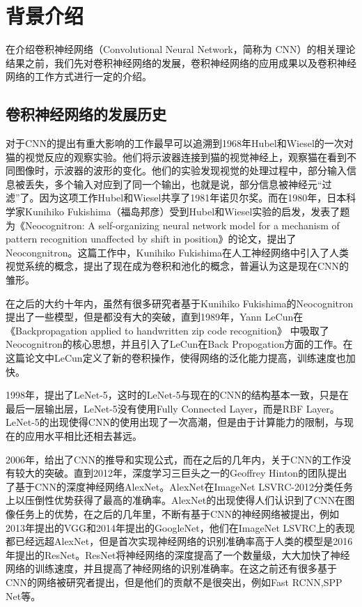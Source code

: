 \chapter{背景介绍}
\label{cha:intro}

在介绍卷积神经网络（Convolutional Neural Network，简称为  CNN）的相关理论结果之前，我们先对卷积神经网络的发展，卷积神经网络的应用成果以及卷积神经网络的工作方式进行一定的介绍。

\section{卷积神经网络的发展历史}
对于CNN的提出有重大影响的工作最早可以追溯到1968年Hubel和Wiesel的一次对猫的视觉反应的观察实验。他们将示波器连接到猫的视觉神经上，观察猫在看到不同图像时，示波器的波形的变化。他们的实验发现视觉的处理过程中，部分输入信息被丢失，多个输入对应到了同一个输出，也就是说，部分信息被神经元“过滤”了。因为这项工作Hubel和Wiesel共享了1981年诺贝尔奖。而在1980年，日本科学家Kunihiko Fukishima（福岛邦彦）受到Hubel和Wiesel实验的启发，发表了题为《Neocognitron: A self-organizing neural network model for a mechanism of pattern recognition unaffected by shift in position》的论文\cite{fukushima1980neocognitron}，提出了Neocongnitron。这篇工作中，Kunihiko Fukishima在人工神经网络中引入了人类视觉系统的概念，提出了现在成为卷积和池化的概念，普遍认为这是现在CNN的雏形。
\par
在之后的大约十年内，虽然有很多研究者基于Kunihiko Fukishima的Neocognitron提出了一些模型，但是都没有大的突破，直到1989年，Yann LeCun在《Backpropagation applied to handwritten zip code recognition》 \cite{lecun1989backpropagation}中吸取了Neocognitron的核心思想，并且引入了LeCun在Back Propogation方面的工作。在这篇论文中LeCun定义了新的卷积操作，使得网络的泛化能力提高，训练速度也加快。
\par
1998年，\citet{lecun1998gradient}提出了LeNet-5，这时的LeNet-5与现在的CNN的结构基本一致，只是在最后一层输出层，LeNet-5没有使用Fully Connected Layer，而是RBF Layer。LeNet-5的出现使得CNN的使用出现了一次高潮，但是由于计算能力的限制，与现在的应用水平相比还相去甚远。
\par
2006年，\citet{bouvrie2006notes}给出了CNN的推导和实现公式，而在之后的几年内，关于CNN的工作没有较大的突破。直到2012年，深度学习三巨头之一的Geoffrey Hinton的团队提出了基于CNN的深度神经网络AlexNet。AlexNet在ImageNet LSVRC-2012分类任务上以压倒性优势获得了最高的准确率。AlexNet的出现使得人们认识到了CNN在图像任务上的优势，在之后的几年里，不断有基于CNN的神经网络被提出，例如2013年提出的VGG\cite{simonyan2014very}和2014年提出的GoogleNet\cite{szegedy2015going}，他们在ImageNet LSVRC上的表现都已经远超AlexNet，但是首次实现神经网络的识别准确率高于人类的模型是2016年\citet{he2016deep}提出的ResNet。ResNet将神经网络的深度提高了一个数量级，大大加快了神经网络的训练速度，并且提高了神经网络的识别准确率。在这之前还有很多基于CNN的网络被研究者提出，但是他们的贡献不是很突出，例如Fast RCNN\cite{girshick2015fast},SPP Net\cite{he2015spatial}等。

